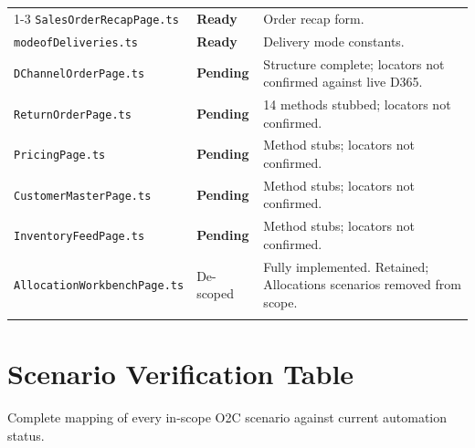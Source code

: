 \documentclass[a4paper,11pt]{article}
\begin{document}
\begin{longtable}{p{} p{} p{}}
\cmidrule{1-3}
\texttt{SalesOrderRecapPage.ts} & \textcolor{statusGreen}{\textbf{Ready}} & Order recap form. \\\relax
\cmidrule{1-3}
\texttt{modeofDeliveries.ts} & \textcolor{statusGreen}{\textbf{Ready}} & Delivery mode constants. \\\relax
\cmidrule{1-3}
\texttt{DChannelOrderPage.ts} & \textcolor{statusYellow}{\textbf{Pending}} & Structure complete; locators not confirmed against live D365. \\\relax
\cmidrule{1-3}
\texttt{ReturnOrderPage.ts} & \textcolor{statusYellow}{\textbf{Pending}} & 14 methods stubbed; locators not confirmed. \\\relax
\cmidrule{1-3}
\texttt{PricingPage.ts} & \textcolor{statusYellow}{\textbf{Pending}} & Method stubs; locators not confirmed. \\\relax
\cmidrule{1-3}
\texttt{CustomerMasterPage.ts} & \textcolor{statusYellow}{\textbf{Pending}} & Method stubs; locators not confirmed. \\\relax
\cmidrule{1-3}
\texttt{InventoryFeedPage.ts} & \textcolor{statusYellow}{\textbf{Pending}} & Method stubs; locators not confirmed. \\\relax
\cmidrule{1-3}
\texttt{AllocationWorkbenchPage.ts} & \textcolor{statusGray}{De-scoped} & Fully implemented. Retained; Allocations scenarios removed from scope. \\\relax
\cmidrule{1-3}
\bottomrule
\end{longtable}

\newpage

\section{Scenario Verification Table}

\noindent Complete mapping of every in-scope O2C scenario against current automation status.
\end{document}
